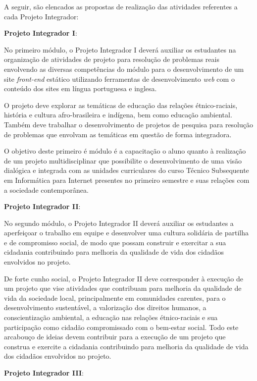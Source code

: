 \documentclass[
	12pt,				%
	openright,			%
	twoside,			%
	a4paper,			%
	chapter=TITLE,		%
	english,			%
	french,				%
	spanish,			%
	brazil,				%
	]{abntex2}
\begin{document}
A seguir, são elencados as propostas de realização das atividades referentes a cada Projeto Integrador:
\begin{alineas}
	\item \textbf{Projeto Integrador I}: 
	
No primeiro módulo, o Projeto
Integrador I deverá auxiliar os estudantes na organização de atividades de
projeto para resolução de problemas reais envolvendo as diversas competências do
módulo para o desenvolvimento de um site \textit{front-end} estático utilizando ferramentas de desenvolvimento \textit{web}
com o conteúdo dos sites em língua portuguesa e inglesa.

O projeto deve explorar as temáticas de educação das relações étnico-raciais, história e cultura afro-brasileira e indígena, bem como educação ambiental. Também deve trabalhar o desenvolvimento de projetos de pesquisa para resolução de problemas que envolvam as temáticas em questão de forma integradora.

O objetivo deste primeiro é módulo é a capacitação o aluno quanto à realização de um projeto multidisciplinar que possibilite o desenvolvimento de uma visão dialógica e integrada com as unidades curriculares do curso Técnico Subsequente em Informática para Internet presentes no primeiro semestre e suas relações com a sociedade contemporânea.

	\item \textbf{Projeto Integrador II}:

No segundo módulo, o Projeto Integrador II deverá auxiliar os estudantes a aperfeiçoar o trabalho em equipe e desenvolver uma cultura solidária de partilha e de compromisso social, de modo que possam construir e exercitar a sua cidadania contribuindo para melhoria da qualidade de vida dos cidadãos envolvidos no projeto.

De forte cunho social, o Projeto Integrador II deve corresponder à execução de um projeto que vise atividades que contribuam para melhoria da qualidade de vida da sociedade local, principalmente em comunidades carentes, para o desenvolvimento sustentável, a valorização dos direitos humanos, a conscientização ambiental, a educação nas relações étnico-raciais e sua participação como cidadão compromissado com o bem-estar social. Todo este arcabouço de ideias devem contribuir para a execução de um projeto que construa e exercite a cidadania contribuindo para melhoria da qualidade de vida dos cidadãos envolvidos no projeto.


	\item \textbf{Projeto Integrador III}: 
	

\end{alineas}
\end{document}
